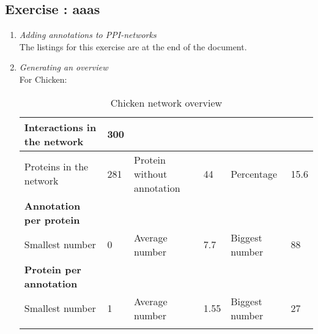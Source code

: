 \documentclass[10pt,a4paper]{article}
\newcommand{\exercise}[1]
{
  \stepcounter{subsection}
  \subsection*{Exercise \thesubsection: #1}

}
\begin{document}
\newpage
\exercise{aaas}
\begin{enumerate}
	
	\item \textit{Adding annotations to PPI-networks}\\
	
		The listings for this exercise are at the end of the document.


	\item \textit{Generating an overview}\\
	
	
	
	
	
	
	For Chicken: 
	
	\begin{table}[H]
		\centering
		\caption{Chicken network overview}
		\label{chickentableoverview}
		\begin{tabular}{llllll}
			\hline
			\multicolumn{1}{|l|}{Interactions in the network}     & \multicolumn{1}{l|}{300} & \multicolumn{1}{l|}{}                           & \multicolumn{1}{l|}{}    & \multicolumn{1}{l|}{}               & \multicolumn{1}{l|}{}     \\ \hline
			\multicolumn{1}{|l|}{Proteins in the network}         & \multicolumn{1}{l|}{281} & \multicolumn{1}{l|}{Protein without annotation} & \multicolumn{1}{l|}{44}  & \multicolumn{1}{l|}{Percentage}     & \multicolumn{1}{l|}{15.6} \\ \hline
			\multicolumn{1}{|l|}{\textbf{Annotation per protein}} & \multicolumn{1}{l|}{}    & \multicolumn{1}{l|}{}                           & \multicolumn{1}{l|}{}    & \multicolumn{1}{l|}{}               & \multicolumn{1}{l|}{}     \\ \hline
			\multicolumn{1}{|l|}{Smallest number}                 & \multicolumn{1}{l|}{0}   & \multicolumn{1}{l|}{Average number}             & \multicolumn{1}{l|}{7.7} & \multicolumn{1}{l|}{Biggest number} & \multicolumn{1}{l|}{88}   \\ \hline
			\multicolumn{1}{|l|}{\textbf{Protein per annotation}} & \multicolumn{1}{l|}{}    & \multicolumn{1}{l|}{}                           & \multicolumn{1}{l|}{}    & \multicolumn{1}{l|}{}               & \multicolumn{1}{l|}{}     \\ \hline
			\multicolumn{1}{|l|}{Smallest number}                 & \multicolumn{1}{l|}{1}   & \multicolumn{1}{l|}{Average number}             & \multicolumn{1}{l|}{1.55} & \multicolumn{1}{l|}{Biggest number} & \multicolumn{1}{l|}{27}  \\ \hline
			&                          &                                                 &                          &                                     &                          
		\end{tabular}
	\end{table}


\end{enumerate}
\end{document}

